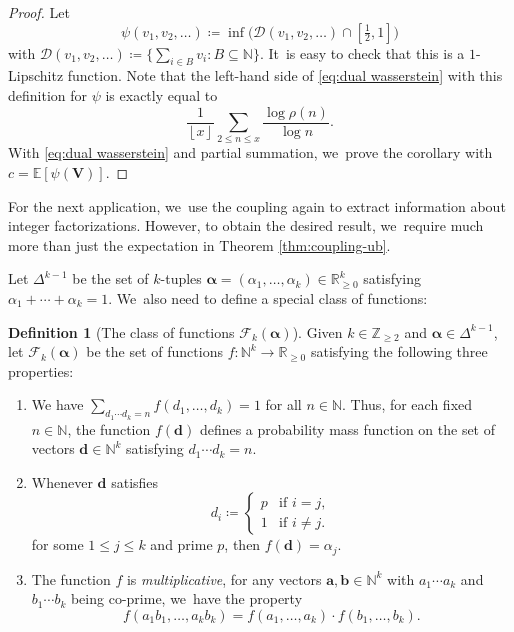 \documentclass[JEP,XML,SOM,Unicode,published]{cedram}
\newenvironment{enumeratea}
{\bgroup\def\theenumi{\alph{enumi}}\begin{enumerate}}
{\end{enumerate}\egroup}
\newcommand{\ba}{{\boldsymbol a}}
\newcommand{\bb}{{\boldsymbol b}}
\newcommand{\bd}{{\boldsymbol d}}
\newcommand{\bV}{{\boldsymbol V}}
\newcommand{\NN}{\mathbb{N}}
\newcommand{\ZZ}{\mathbb{Z}}
\newcommand{\RR}{\mathbb{R}}
\newcommand{\EE}{\mathbb{E}}
\newcommand{\boldalpha}{\boldsymbol{\alpha}}
\newcommand{\floor}[1]{\left\lfloor #1 \right\rfloor}
\newcommand{\simplex}{\Delta^{k-1}}
\theoremstyle{plain}
\theoremstyle{definition}
\newtheorem{deff}[cor]{Definition}
\begin{document}
\begin{proof}
Let
\[
\psi(v_1, v_2, \ldots) \coloneqq \inf \big( \mathcal D(v_1, v_2, \ldots) \cap [\tfrac{1}{2}, 1]\big)
\]
with $\mathcal D(v_1, v_2, \ldots) \coloneqq \{\sum_{i \in B} v_i : B\subseteq \mathbb N\}$. It~is easy to check that this is a $1$-Lipschitz function. Note that the left-hand side of \eqref{eq:dual wasserstein} with this definition for $\psi$ is exactly equal to
\[
\frac{1}{\floor x} \sum_{2 \le n \le x} \frac{\log \rho(n)}{\log n}.
\]
With \eqref{eq:dual wasserstein} and partial summation, we~prove the corollary with $c = \EE[\psi(\bV)]$.
\end{proof}

For the next application, we~use the coupling again to extract information about integer factorizations. However, to obtain the desired result, we~require much more than just the expectation in Theorem \ref{thm:coupling-ub}.

Let $\simplex$ be the set of $k$-tuples $\boldalpha=(\alpha_1, \ldots, \alpha_k) \in \RR^k_{\ge 0}$ satisfying $\alpha_1+\cdots+\alpha_k=1$. We~also need to define a special class of functions:

\begin{deff}[The class of functions $\mathcal F_k(\boldalpha)$]\label{dfn:Fktheta}
Given $k\in\ZZ_{\ge2}$ and $\boldalpha\in \simplex$, let $\mathcal F_k(\boldalpha)$ be the set of functions $f \colon \NN^{k} \to \RR_{ \ge 0}$ satisfying the following three properties:
\begin{enumeratea}
\item\label{dfn:Fkthetaa} We have $\sum_{d_1\cdots d_k = n} f(d_1, \ldots, d_k) = 1$ for all $n \in \NN$. Thus, for each fixed $n \in \NN$, the function $f(\bd)$ defines a probability mass function on the set of vectors $\bd \in \NN^k$ satisfying $d_1\cdots d_k = n$.

\item\label{dfn:Fkthetab} Whenever $\bd$ satisfies
\[
d_i \coloneqq \begin{cases}
p &\text{if $i = j$}, \\
1 &\text{if $i \ne j$}.
\end{cases}
\]
for some $1 \le j \le k$ and prime $p$, then $f(\bd) = \alpha_j$.

\item\label{dfn:Fkthetac} The function $f$ is \emph{multiplicative}, \ie for any vectors $\ba, \bb \in \NN^k$ with $a_1\cdots a_k$ and $b_1 \cdots b_k$ being co-prime, we~have the property
\[
f(a_1b_1, \ldots, a_kb_k) = f(a_1, \ldots, a_k) \cdot f(b_1, \ldots, b_k).
\]
\end{enumeratea}
\end{deff}
\end{document}
